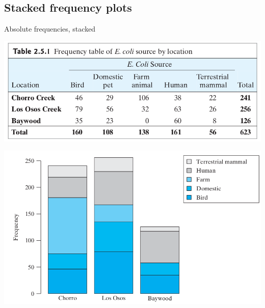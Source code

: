 \subsection{Stacked frequency plots}

\begin{frame}{Absolute frequencies, stacked}
    \begin{center}
            \includegraphics[width=.8\textwidth]{ecoli-counts-tab2_5_1.png}

            \includegraphics[width=.8\textwidth]{ecoli-counts-fig2_5_1.png}
    \end{center}
\end{frame}

